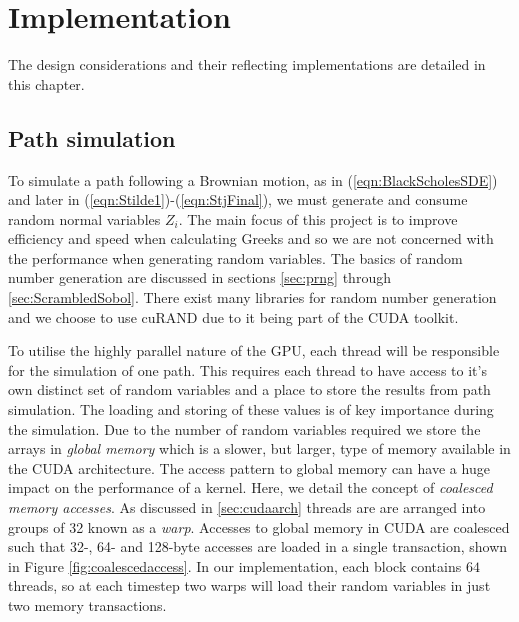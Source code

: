 \chapter{Implementation} \label{cha:Implementation}
The design considerations and their reflecting implementations are detailed in this chapter.

\section{Path simulation}
To simulate a path following a Brownian motion, as in (\ref{eqn:BlackScholesSDE}) and later in (\ref{eqn:Stilde1})-(\ref{eqn:StjFinal}), we must generate and consume random normal variables $Z_i$. The main focus of this project is to improve efficiency and speed when calculating Greeks and so we are not concerned with the performance when generating random variables. The basics of random number generation are discussed in sections \ref{sec:prng} through \ref{sec:ScrambledSobol}. There exist many libraries for random number generation and we choose to use cuRAND \cite{curand} due to it being part of the CUDA toolkit.

To utilise the highly parallel nature of the GPU, each thread will be responsible for the simulation of one path. This requires each thread to have access to it's own distinct set of random variables and a place to store the results from path simulation. The loading and storing of these values is of key importance during the simulation. Due to the number of random variables required we store the arrays in \textit{global memory} which is a slower, but larger, type of memory available in the CUDA architecture. The access pattern to global memory can have a huge impact on the performance of a kernel. Here, we detail the concept of \textit{coalesced memory accesses}. As discussed in \ref{sec:cudaarch} threads are are arranged into groups of 32 known as a \textit{warp}. Accesses to global memory in CUDA are coalesced such that 32-, 64- and 128-byte accesses are loaded in a single transaction, shown in Figure \ref{fig:coalescedaccess}. In our implementation, each block contains $64$ threads, so at each timestep two warps will load their random variables in just two memory transactions.

